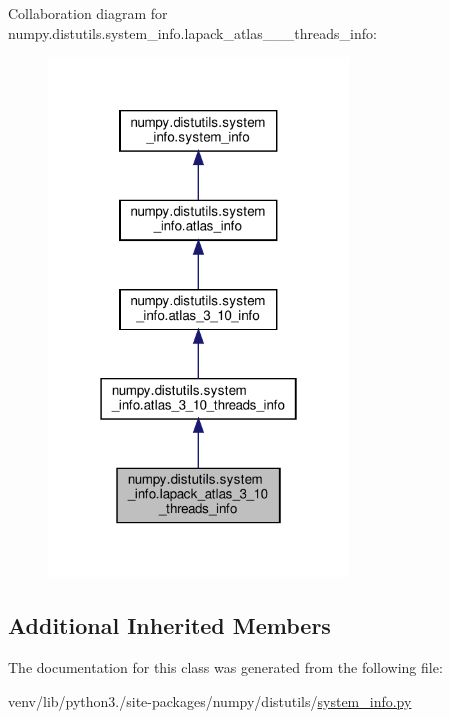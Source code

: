 Collaboration diagram for numpy.\+distutils.\+system\+\_\+info.\+lapack\+\_\+atlas\+\_\+\_\+\_\+threads\+\_\+info\+:
\nopagebreak
\begin{figure}[H]
\begin{center}
\leavevmode
\includegraphics[width=226pt]{classnumpy_1_1distutils_1_1system__info_1_1lapack__atlas__3__10__threads__info__coll__graph}
\end{center}
\end{figure}
\subsection*{Additional Inherited Members}


The documentation for this class was generated from the following file\+:\begin{DoxyCompactItemize}
\item 
venv/lib/python3./site-\/packages/numpy/distutils/\hyperlink{system__info_8py}{system\+\_\+info.\+py}\end{DoxyCompactItemize}
